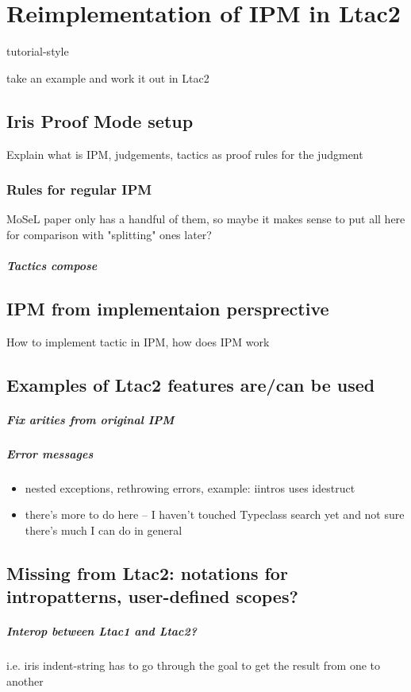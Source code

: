 \chapter{Reimplementation of IPM in Ltac2}

tutorial-style

take an example and work it out in Ltac2

\section{Iris Proof Mode setup}

Explain what is IPM, judgements, tactics as proof rules for the judgment

\subsection{Rules for regular IPM}

MoSeL paper only has a handful of them, so maybe it makes sense to put all here for comparison with "splitting" ones later?

\paragraph{Tactics compose}

\section{IPM from implementaion persprective}

How to implement tactic in IPM, how does IPM work

\section{Examples of Ltac2 features are/can be used}

\paragraph{Fix arities from original IPM}

\paragraph{Error messages}

\begin{itemize}
\item nested exceptions, rethrowing errors, example: iintros uses idestruct
\item there's more to do here -- I haven't touched Typeclass search yet and not sure there's much I can do in general
\end{itemize}

\section{Missing from Ltac2: notations for intropatterns, user-defined scopes?}

\paragraph{Interop between Ltac1 and Ltac2?}
i.e. iris indent-string has to go through the goal to get the result from one to another